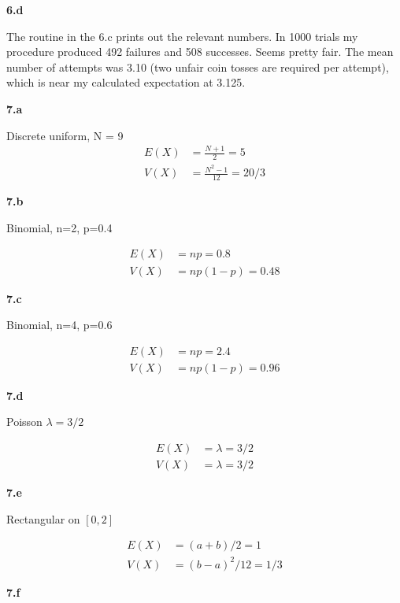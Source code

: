\documentclass{article}
\newcommand{\1}{\mathbf{1}}
\begin{document}
\vspace{\baselineskip}
\noindent \textbf{\large 6.d}

The routine in the 6.c prints out the relevant numbers.  In 1000 trials my procedure produced 492 failures and 508 successes.  Seems pretty fair.  The mean number of attempts was 3.10 (two unfair coin tosses are required per attempt), which is near my calculated expectation at 3.125.

\vspace{\baselineskip}
\noindent \textbf{\large 7.a}

Discrete uniform, N = 9
\begin{align*}
E(X) &= \frac{N+1}{2} = 5 \\
V(X) &= \frac{N^2-1}{12} = 20/3
\end{align*}

\vspace{\baselineskip}
\noindent \textbf{\large 7.b}

Binomial, n=2, p=0.4

\begin{align*}
E(X) &= np = 0.8 \\
V(X) &= np(1-p) = 0.48
\end{align*}

\vspace{\baselineskip}
\noindent \textbf{\large 7.c}

Binomial, n=4, p=0.6

\begin{align*}
E(X) &= np = 2.4 \\
V(X) &= np(1-p) = 0.96
\end{align*}

\vspace{\baselineskip}
\noindent \textbf{\large 7.d}

Poisson $\lambda=3/2$

\begin{align*}
E(X) &= \lambda = 3/2 \\
V(X) &= \lambda = 3/2
\end{align*}

\vspace{\baselineskip}
\noindent \textbf{\large 7.e}

Rectangular on $[0,2]$

\begin{align*}
E(X) &= (a+b)/2 = 1 \\
V(X) &= (b-a)^2/12 = 1/3
\end{align*}

\vspace{\baselineskip}
\noindent \textbf{\large 7.f}
\end{document}
